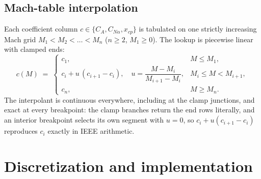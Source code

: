 \subsection{Mach-table interpolation}

Each coefficient column $c \in \{C_A, C_{N\alpha}, x_{cp}\}$ is tabulated
on one strictly increasing Mach grid $M_1 < M_2 < \dots < M_n$
($n \ge 2$, $M_1 \ge 0$). The lookup is piecewise linear with clamped
ends:
\begin{equation}
  c(M) \;=\;
  \begin{cases}
    c_1, & M \le M_1, \\[2pt]
    c_i + u\, (c_{i+1} - c_i),
      \quad u = \dfrac{M - M_i}{M_{i+1} - M_i},
      & M_i \le M < M_{i+1}, \\[8pt]
    c_n, & M \ge M_n .
  \end{cases}
  \label{eq:aero:interp}
\end{equation}
The interpolant is continuous everywhere, including at the clamp
junctions, and exact at every breakpoint: the clamp branches return the
end rows literally, and an interior breakpoint selects its own segment
with $u = 0$, so $c_i + u(c_{i+1} - c_i)$ reproduces $c_i$ exactly in
IEEE arithmetic.

\section{Discretization and implementation}
\label{sec:aero:implementation}

